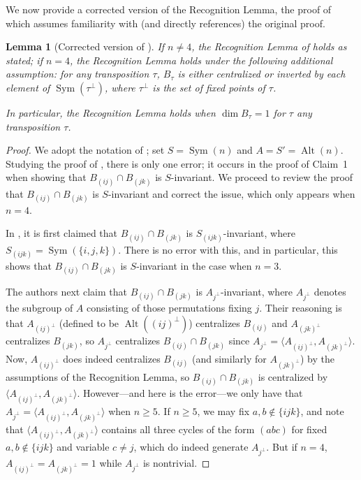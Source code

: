 \documentclass[a4paper, 11pt]{amsart}
\theoremstyle{plain}
\newtheorem{lemma}[theorem]{Lemma}
\theoremstyle{definition}
\theoremstyle{remark}
\DeclareMathOperator{\Sym}{Sym}
\DeclareMathOperator{\Alt}{Alt}
\begin{document}
We now provide a corrected version of the Recognition Lemma, the proof of which assumes familiarity with (and directly references) the original proof.

\begin{lemma}[Corrected version of {\cite[Recognition Lemma]{CDW23}}]\label{lemma.RecognitionUpdate}
If $n\neq 4$, the Recognition Lemma of \cite{CDW23} holds as stated; if $n= 4$, the Recognition Lemma holds under the following additional assumption: for any transposition $\tau$, $B_\tau$ is either centralized or inverted by each element of $\Sym(\tau^\perp)$, where $\tau^\perp$ is the set of fixed points of $\tau$. 

In particular, the Recognition Lemma holds when  $\dim B_\tau = 1$ for $\tau$ any transposition $\tau$.
\end{lemma}
\begin{proof}
We adopt the notation of \cite{CDW23}; set $S = \Sym(n)$ and $A = S' = \Alt(n)$.
Studying the proof of \cite[Recognition Lemma]{CDW23}, there is only one error; it occurs in the proof of Claim~1 when showing that $B_{(ij)} \cap B_{(jk)}$ is $S$-invariant. We proceed to review the proof that $B_{(ij)} \cap B_{(jk)}$ is $S$-invariant and correct the issue, which only appears when $n=4$.

In \cite{CDW23}, it is first claimed that $B_{(ij)} \cap B_{(jk)}$ is $S_{(ijk)}$-invariant, where $S_{(ijk)} = \Sym(\{i,j,k\})$. There is no error with this, and in particular, this shows that $B_{(ij)} \cap B_{(jk)}$ is $S$-invariant in the case when $n=3$. 

The authors next claim that $B_{(ij)} \cap B_{(jk)}$ is $A_{j^\perp}$-invariant, where $A_{j^\perp}$ denotes the subgroup of $A$ consisting of those permutations fixing $j$. Their reasoning is that $A_{(ij)^\perp}$ (defined to be $\Alt((ij)^\perp)$) centralizes $B_{(ij)}$ and $A_{(jk)^\perp}$  centralizes $B_{(jk)}$, so $A_{j^\perp}$ centralizes $B_{(ij)} \cap B_{(jk)}$ since $A_{j^\perp} = \langle A_{(ij)^\perp}, A_{(jk)^\perp} \rangle$. Now, $A_{(ij)^\perp}$ does indeed centralizes $B_{(ij)}$ (and similarly for $A_{(jk)^\perp}$) by the assumptions  of the Recognition Lemma, so $B_{(ij)} \cap B_{(jk)}$ is centralized by $\langle A_{(ij)^\perp}, A_{(jk)^\perp} \rangle$. However---and here is the error---we only have that $A_{j^\perp} = \langle A_{(ij)^\perp}, A_{(jk)^\perp} \rangle$ when $n\ge 5$. If $n\ge 5$, we may fix $a,b\notin \{ijk\}$, and note that $\langle A_{(ij)^\perp}, A_{(jk)^\perp} \rangle$ contains all three cycles of the form $(abc)$ for fixed $a,b\notin \{ijk\}$ and variable $c\neq j$, which do indeed generate $A_{j^\perp}$. But if $n=4$, $A_{(ij)^\perp}=A_{(jk)^\perp}=1$ while $A_{j^\perp}$ is nontrivial.


\end{proof}
\end{document}
